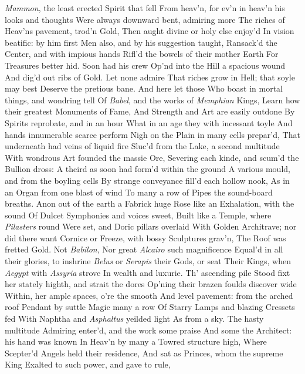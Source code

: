 \documentclass[11pt]{book}
\newcounter {first}
\newcounter {last}
\begin{document}
\textit{Mammon}, the least erected Spirit that fell 
From heav'n, for ev'n in heav'n his looks and thoughts 
Were always downward bent, admiring more 
The riches of Heav'ns pavement, trod'n Gold, 
Then aught divine or holy else enjoy'd 
In vision beatific: by him first 
Men also, and by his suggestion taught, 
Ransack'd the Center, and with impious hands 
Rifl'd the bowels of their mother Earth 
For Treasures better hid.  Soon had his crew 
Op'nd into the Hill a spacious wound 
And dig'd out ribs of Gold.  Let none admire 
That riches grow in Hell; that soyle may best 
Deserve the pretious bane.  And here let those 
Who boast in mortal things, and wondring tell 
Of \textit{Babel}, and the works of \textit{Memphian} Kings, 
Learn how their greatest Monuments of Fame, 
And Strength and Art are easily outdone 
By Spirits reprobate, and in an hour 
What in an age they with incessant toyle 
And hands innumerable scarce perform 
Nigh on the Plain in many cells prepar'd, 
That underneath had veins of liquid fire 
Sluc'd from the Lake, a second multitude 
With wondrous Art founded the massie Ore, 
Severing each kinde, and scum'd the Bullion dross: 
A theird as soon had form'd within the ground 
A various mould, and from the boyling cells 
By strange conveyance fill'd each hollow nook, 
As in an Organ from one blast of wind 
To many a row of Pipes the sound-board breaths. 
Anon out of the earth a Fabrick huge 
Rose like an Exhalation, with the sound 
Of Dulcet Symphonies and voices sweet, 
Built like a Temple, where \textit{Pilasters} round 
Were set, and Doric pillars overlaid 
With Golden Architrave; nor did there want 
Cornice or Freeze, with bossy Sculptures grav'n, 
The Roof was fretted Gold.  Not \textit{Babilon}, 
Nor great \textit{Alcairo} such magnificence 
Equal'd in all their glories, to inshrine 
\textit{Belus} or \textit{Serapis} their Gods, or seat 
Their Kings, when \textit{Aegypt} with \textit{Assyria} strove 
In wealth and luxurie.  Th' ascending pile 
Stood fixt her stately highth, and strait the dores 
Op'ning their brazen foulds discover wide 
Within, her ample spaces, o're the smooth 
And level pavement: from the arched roof 
Pendant by suttle Magic many a row 
Of Starry Lamps and blazing Cressets fed 
With Naphtha and \textit{Asphaltus} yeilded light 
As from a sky.  The hasty multitude 
Admiring enter'd, and the work some praise 
And some the Architect: his hand was known 
In Heav'n by many a Towred structure high, 
Where Scepter'd Angels held their residence, 
And sat as Princes, whom the supreme King 
Exalted to such power, and gave to rule, 
\end{document}
